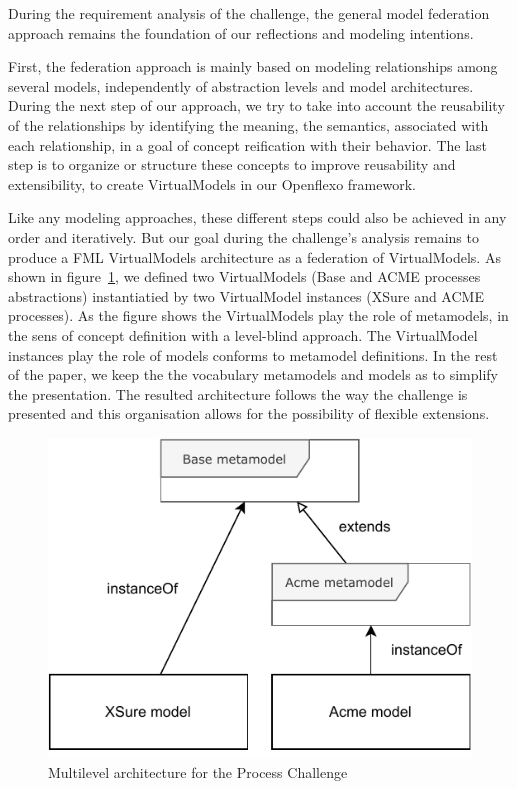 
During the requirement analysis of the challenge, the general model federation approach remains the foundation of our reflections and modeling intentions. 

First, the federation approach is mainly based on modeling relationships among several models, independently of abstraction levels and model architectures.
During the next step of our approach, we try to take into account the reusability of the relationships by identifying the meaning, the semantics, associated with each relationship, in a goal of concept reification with their behavior. The last step is to organize or structure these concepts to improve reusability and extensibility, to create VirtualModels in our Openflexo framework.     

Like any modeling approaches, these different steps could also be achieved in any order and iteratively. But our goal during the challenge's analysis remains to produce a FML VirtualModels architecture as a federation of VirtualModels. 
As shown in figure~\ref{fig:MultilevelArchitecture}, we defined two VirtualModels (Base and ACME processes abstractions) instantiatied by two VirtualModel instances (XSure and ACME processes). As the figure shows the VirtualModels play the role of metamodels, in the sens of concept definition with a level-blind approach. The VirtualModel instances play the role of models conforms to metamodel definitions. In the rest of the paper, we keep the the vocabulary metamodels and models as to simplify the presentation.
The resulted architecture follows the way the challenge is presented and this organisation allows for the possibility of flexible extensions.

\begin{figure}
    \centering
    \includegraphics[width=0.7 \columnwidth]{Figures/MultilevelArchitecture.pdf}
    \caption{Multilevel architecture for the Process Challenge}
    \label{fig:MultilevelArchitecture}
\end{figure}

